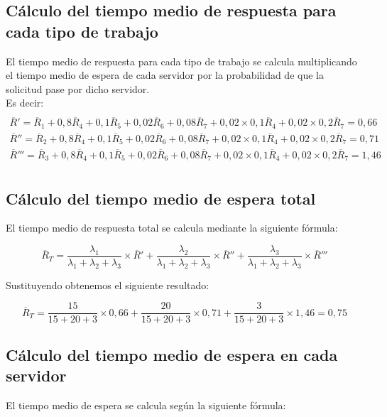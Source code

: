 \subsection{Cálculo del tiempo medio de respuesta para cada tipo de trabajo}
El tiempo medio de respuesta para cada tipo de trabajo se calcula multiplicando el tiempo medio de espera de cada servidor por la probabilidad de que la solicitud pase por dicho servidor.\\

Es decir:
\begin{multline}\\
\overline{R}' = \overline{R}_{1} + 0,8\overline{R}_{4} + 0,1\overline{R}_{5} + 0,02\overline{R}_{6} + 0,08\overline{R}_{7} + 0,02\times 0,1\overline{R}_{4} + 0,02\times 0,2\overline{R}_{7} = 0,66\\
\overline{R}'' = \overline{R}_{2} + 0,8\overline{R}_{4} + 0,1\overline{R}_{5} + 0,02\overline{R}_{6} + 0,08\overline{R}_{7} + 0,02\times 0,1\overline{R}_{4} + 0,02\times 0,2\overline{R}_{7} = 0,71\\
\overline{R}''' = \overline{R}_{3} + 0,8\overline{R}_{4} + 0,1\overline{R}_{5} + 0,02\overline{R}_{6} + 0,08\overline{R}_{7} + 0,02\times 0,1\overline{R}_{4} + 0,02\times 0,2\overline{R}_{7} = 1,46\\
\end{multline}

\subsection{Cálculo del tiempo medio de espera total}
El tiempo medio de respuesta total se calcula mediante la siguiente fórmula:

\begin{equation}
\overline{R}_{T} = \frac{\lambda_{1}}{\lambda_{1}+\lambda_{2}+\lambda_{3}}\times \overline{R}' + \frac{\lambda_{2}}{\lambda_{1}+\lambda_{2}+\lambda_{3}}\times \overline{R}'' + \frac{\lambda_{3}}{\lambda_{1}+\lambda_{2}+\lambda_{3}}\times \overline{R}'''
\end{equation}

Sustituyendo obtenemos el siguiente resultado:

\begin{equation}
\overline{R}_{T} = \frac{15}{15+20+3}\times 0,66 + \frac{20}{15+20+3}\times 0,71 + \frac{3}{15+20+3}\times 1,46 = 0,75
\end{equation}

\subsection{Cálculo del tiempo medio de espera en cada servidor}
El tiempo medio de espera se calcula según la siguiente fórmula:

